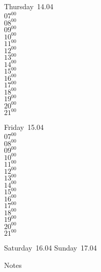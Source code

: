 \documentclass[11pt,a4paper]{book}\usepackage[]{graphicx}\usepackage[]{color}
\begin{document}
\clearpage
\begin{headerbox}
\end{headerbox}
\begin{weekdaybox}
  Thursday~14.04\\
  { 
  \vfill
  $07^{00}$\\
$08^{00}$\\
$09^{00}$\\
$10^{00}$\\
$11^{00}$\\
$12^{00}$\\
$13^{00}$\\
$14^{00}$\\
$15^{00}$\\
$16^{00}$\\
$17^{00}$\\
$18^{00}$\\
$19^{00}$\\
$20^{00}$\\
$21^{00}$\\
  }
\end{weekdaybox} 
\begin{weekdaybox}
  Friday~15.04\\
  { 
  \vfill
  $07^{00}$\\
$08^{00}$\\
$09^{00}$\\
$10^{00}$\\
$11^{00}$\\
$12^{00}$\\
$13^{00}$\\
$14^{00}$\\
$15^{00}$\\
$16^{00}$\\
$17^{00}$\\
$18^{00}$\\
$19^{00}$\\
$20^{00}$\\
$21^{00}$\\
  }
\end{weekdaybox}
\begin{weekendbox}
  Saturday~16.04
  \tcblower
  Sunday~17.04
\end{weekendbox} %
\begin{notebox}
  Notes
\end{notebox}
\clearpage
\end{document}
